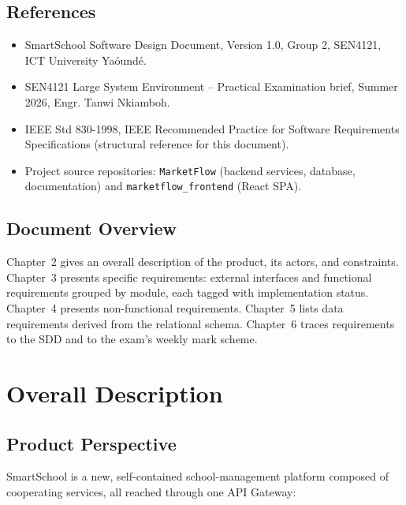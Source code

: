 \documentclass[11pt,a4paper]{report}
\newcommand{\sysname}{SmartSchool}
\begin{document}
\section{References}
\begin{itemize}[itemsep=2pt]
    \item \sysname{} Software Design Document, Version 1.0, Group 2, SEN4121, ICT University Ya\'ound\'e.
    \item SEN4121 Large System Environment -- Practical Examination brief, Summer 2026, Engr. Tanwi Nkiamboh.
    \item IEEE Std 830-1998, IEEE Recommended Practice for Software Requirements Specifications (structural reference for this document).
    \item Project source repositories: \texttt{MarketFlow} (backend services, database, documentation) and \texttt{marketflow\_frontend} (React SPA).
\end{itemize}

\section{Document Overview}
Chapter~2 gives an overall description of the product, its actors, and
constraints. Chapter~3 presents specific requirements: external interfaces
and functional requirements grouped by module, each tagged with
implementation status. Chapter~4 presents non-functional requirements.
Chapter~5 lists data requirements derived from the relational schema.
Chapter~6 traces requirements to the SDD and to the exam's weekly mark
scheme.

\chapter{Overall Description}

\section{Product Perspective}
\sysname{} is a new, self-contained school-management platform composed of
cooperating services, all reached through one API Gateway:
\end{document}
